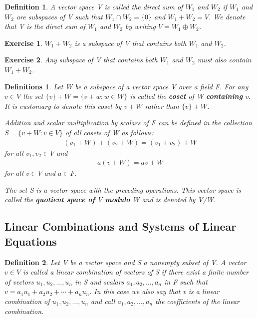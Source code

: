\documentclass{article}
\newcommand{\bd}[1]{\textbf{#1}}
\theoremstyle{plain}
\newtheorem*{definition1}{Definition}
\newtheorem*{definitions}{Definitions}
\newtheorem*{exercise}{Exercise}
\theoremstyle{plain} %
\begin{document}
\begin{definition1}
A vector space V is called the direct sum of $W_1$ and $W_2$ if $W_1$ and $W_2$ are subspaces of V such that $W_1 \cap W_2 = \{0 \}$ and $W_1 + W_2 = V$. We denote that V is the direct sum of $W_1$ and $W_2$ by writing $V = W_1 \oplus W_2$.
\end{definition1}

\begin{exercise}
$W_1 + W_2$ is a subspace of V that contains both $W_1$ and $W_2$.
\end{exercise}

\begin{exercise}
Any subspace of V that contains both $W_1$ and $W_2$ must also contain $W_1 + W_2$.
\end{exercise}

\begin{definitions}
Let W be a subspace of a vector space V over a field F. For any $v \in V$ the set $\{v\}+W = \{v+w: w \in W\}$ is called the \bd{coset} of W \bd{containing} v. It is customary to denote this coset by $v + W$ rather than $\{v\} + W$.

Addition and scalar multiplication by scalars of F can be defined in the collection $S = \{v + W: v \in V\}$ of all cosets of W as follows:
\begin{align}
(v_1 + W)+(v_2 + W)=(v_1 + v_2) + W
\end{align}
for all $v_1, v_2 \in V$ and
\begin{align}
a(v + W) = av + W
\end{align}
for all $v \in V$ and $a \in F$.

The set S is a vector space with the preceding operations. This vector space is called the \bd{quotient space of} V \bd{modulo} W and is denoted by V/W.
\end{definitions}

\subsection{Linear Combinations and Systems of Linear Equations}

\begin{definition1}
Let V be a vector space and S a nonempty subset of V. A vector $v \in V$ is called a linear combination of vectors of S if there exist a finite number of vectors $u_1, u_2,\ldots,u_n$ in S and scalars $a_1, a_2,\ldots,a_n$ in F such that $v = a_1u_1 + a_2u_2 + \cdots + a_nu_n$. In this case we also say that v is a linear combination of $u_1, u_2,\ldots,u_n$ and call $a_1, a_2,\ldots,a_n$ the coefficients of the linear combination.
\end{definition1}
\end{document}
